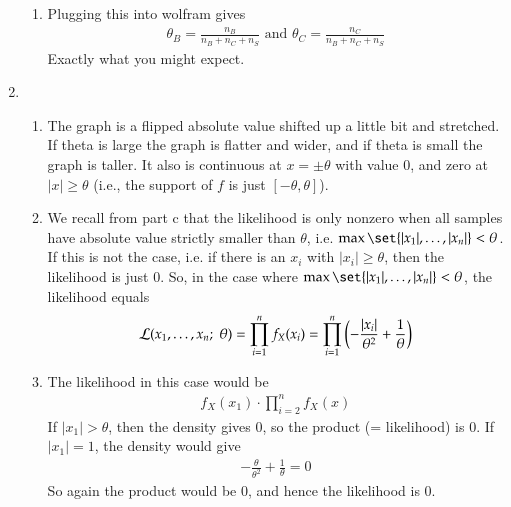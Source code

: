 \documentclass[12pt]{article}
\theoremstyle{definitionstyle}
\renewcommand{\L}{\mathcal{L}}
\newcommand{\semi}{; \;}
\begin{document}
\begin{enumerate}[leftmargin=\labelsep]
\begin{enumerate}
			\item Plugging this into wolfram gives
			\begin{align*}
				\theta_B = \frac{n_B}{n_B+n_C+n_S} \text{ and } \theta_C = \frac{n_C}{n_B+n_C+n_S}
			\end{align*}
			Exactly what you might expect.
		\end{enumerate}
		
		\newpage
		\item \begin{enumerate}
			\item The graph is a flipped absolute value shifted up a little bit and stretched. If theta is large the graph is flatter and wider, and if theta is small the graph is taller. It also is continuous at $x = \pm \theta$ with value 0, and zero at $|x| \geq \theta$ (i.e., the support of $f$ is just $[-\theta, \theta]$).
			\item We recall from part c that the likelihood is only nonzero when all samples have absolute value strictly smaller than $\theta$, i.e. $\max\set{|x_1|, \ldots, |x_n|} < \theta$. If this is not the case, i.e. if there is an $x_i$ with $|x_i| \geq \theta$, then the likelihood is just 0. So, in the case where $\max\set{|x_1|, \ldots, |x_n|} < \theta$, the likelihood equals
			\begin{align*}
				\L(x_1, \ldots, x_n \semi \theta) = \prod_{i=1}^n f_X(x_i) = \prod_{i=1}^n \qty(-\frac{|x_i|}{\theta^2} + \frac{1}{\theta})
			\end{align*}
			\item The likelihood in this case would be
			\begin{align*}
				f_X(x_1) \cdot \prod_{i=2}^n f_X(x)
			\end{align*}
			If $|x_1| > \theta$, then the density gives 0, so the product (= likelihood) is 0. If $|x_1| = 1$, the density would give
			\begin{align*}
				-\frac{\theta}{\theta^2}+\frac{1}{\theta} = 0
			\end{align*}
			So again the product would be 0, and hence the likelihood is 0.
			

\end{enumerate}
\end{enumerate}
\end{document}
